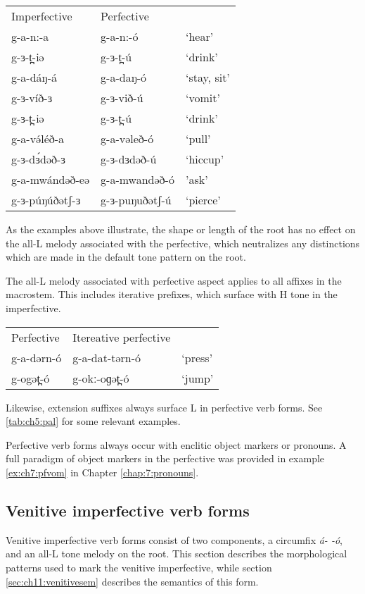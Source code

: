 \ea \begin{tabular}[t]{lll}
Imperfective & Perfective & \\
g-a-n:-a	&	 g-a-n:-ó  & ‘hear’\\
g-ɜ-t̪-iə	&	g-ɜ-t̪-ú & ‘drink’\\
g-a-dáŋ-á & g-a-daŋ-ó & `stay, sit' \\
g-ɜ-víð-ɜ & 	g-ɜ-við-ú	&	`vomit’\\
g-ɜ-t̪-iə	&	g-ɜ-t̪-ú & ‘drink’\\
g-a-və́léð-a &  g-a-vəleð-ó  & ‘pull’ \\
g-ɜ-dɜ́dəð-ɜ	& g-ɜ-dɜdəð-ú	& `hiccup' \\
g-a-mwándəð-eə	& g-a-mwandəð-ó &  'ask'\\
g-ɜ-púŋúðətʃ-ɜ	&  g-ɜ-puŋuðətʃ-ú & 	`pierce' \\
\end{tabular}
\z 
As the examples above illustrate, the shape or length of the root has no effect on the all-L melody associated with the perfective, which neutralizes any distinctions which are made in the default tone pattern on the root. 

The all-L melody associated with perfective aspect applies to all affixes in the macrostem. This includes iterative prefixes, which surface with H tone in the imperfective. 

\ea \begin{tabular}[t]{lll}
Perfective & Itereative perfective & \\
g-a-dərn-ó	&	g-a-dat-tərn-ó	&	‘press’\\
g-ogət̪-ó	&	g-okː-oɡət̪-ó	&	‘jump’\\ 	
\end{tabular}
\z  
Likewise, extension suffixes always surface L in perfective verb forms. See \ref{tab:ch5:pal} for some relevant examples.

Perfective verb forms always occur with enclitic object markers or pronouns. A full paradigm of object markers in the perfective was provided in example \ref{ex:ch7:pfvom} in Chapter \ref{chap:7:pronouns}.
 
 
\subsection{Venitive imperfective verb forms}\label{sec:ch11:venitive}

Venitive imperfective verb forms consist of two components, a circumfix \textit{á- -ó}, and an all-L tone melody on the root. This section describes the morphological patterns used to mark the venitive imperfective, while section \ref{sec:ch11:venitivesem} describes the semantics of this form.

